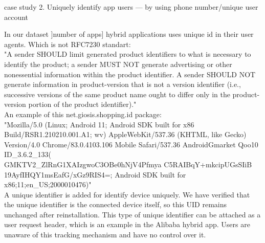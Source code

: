 case study 2.  Uniquely identify app users — by using phone number/unique user account 

In our dataset ]number of apps] hybrid applications uses unique id in their user agents. Which is not  RFC7230 standart:\\

"A sender SHOULD limit generated product identifiers to what is
   necessary to identify the product; a sender MUST NOT generate
   advertising or other nonessential information within the product
   identifier.  A sender SHOULD NOT generate information in
   product-version that is not a version identifier (i.e., successive versions of the same product name ought to differ only in the product-version portion of the product identifier)." \\
   
   
An example of this net.giosis.shopping.id package:
\\

               "Mozilla/5.0 (Linux; Android 11; Android SDK built for x86                        Build/RSR1.210210.001.A1; wv) AppleWebKit/537.36 (KHTML, like Gecko) Version/4.0 Chrome/83.0.4103.106 Mobile Safari/537.36 AndroidGmarket Qoo10 ID\_3.6.2\_133(\\GMKTV2\_ZlRnG1XAIzgwoC3OBe0hNjV4Pfmya
 C5RAIBqY+mkcipUGsSIiB\\19AyfIHQY1msEafG/xGz9RIS4=;
 Android SDK built for x86;11;en\_US;2000010476)"
 \\
 
A unique identifier is added for identify device uniquely. We have verified that the unique identifier is the connected device itself, so this UID remains unchanged after reinstallation.
This type of unique identifier can be attached as a user request header, which is an example in the Alibaba hybrid app. Users are unaware of this tracking mechanism and have no control over it. 

